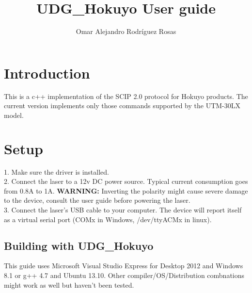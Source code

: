 \documentclass{book}
\title{UDG\_Hokuyo User guide}
\author{Omar Alejandro Rodr\'{i}guez Rosas}
\begin{document}
\tableofcontents
\chapter{Introduction}
This is a c++ implementation of the SCIP 2.0 protocol for Hokuyo products. The current version implements only those commands supported by the UTM-30LX model.\\
\chapter{Setup}
1. Make sure the driver is installed.\\
2. Connect the laser to a 12v DC power source. Typical current consumption goes from 0.8A to 1A. \textbf{WARNING: }Inverting the polarity might cause severe damage to the device, consult the user guide before powering the laser.\\
3. Connect the laser's USB cable to your computer. The device will report itself as a virtual serial port (COMx in Windows, /dev/ttyACMx in linux).\\
\section{Building with UDG\_Hokuyo}
This guide uses Microsoft Visual Studio Express for Desktop 2012 and Windows 8.1 or g++ 4.7 and Ubuntu 13.10. Other compiler/OS/Distribution combnations might work as well but haven't been tested.\\
\end{document}
